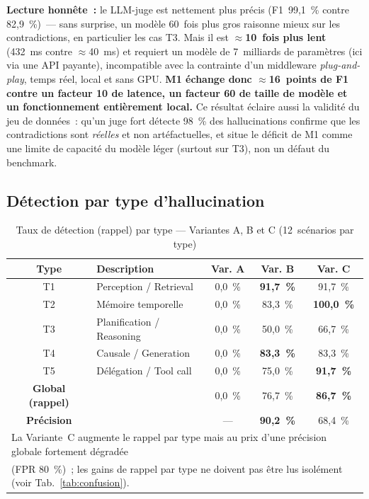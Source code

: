 \documentclass[12pt,a4paper]{article}
\begin{document}
\textbf{Lecture honnête~:} le LLM-juge est nettement plus précis (F1~99,1~\% contre 82,9~\%)~--- sans surprise, un modèle 60~fois plus gros raisonne mieux sur les contradictions, en particulier les cas T3. Mais il est $\approx$\textbf{10~fois plus lent} (432~ms contre $\approx$40~ms) et requiert un modèle de 7~milliards de paramètres (ici via une API payante), incompatible avec la contrainte d'un middleware \emph{plug-and-play}, temps réel, local et sans GPU. \textbf{M1 échange donc $\approx$16~points de F1 contre un facteur 10 de latence, un facteur 60 de taille de modèle et un fonctionnement entièrement local.} Ce résultat éclaire aussi la validité du jeu de données~: qu'un juge fort détecte 98~\% des hallucinations confirme que les contradictions sont \emph{réelles} et non artéfactuelles, et situe le déficit de M1 comme une limite de capacité du modèle léger (surtout sur T3), non un défaut du benchmark.

\subsection{Détection par type d'hallucination}

\begin{table}[H]
\centering
\caption{Taux de détection (rappel) par type --- Variantes A, B et C (12~scénarios par type)}
\label{tab:results_by_type}
\renewcommand{\arraystretch}{1.25}
\begin{tabular}{clccc}
\toprule
\textbf{Type} & \textbf{Description} & \textbf{Var. A} & \textbf{Var. B} & \textbf{Var. C} \\
\midrule
T1 & Perception / Retrieval    & 0,0~\% & \textbf{91,7~\%} & 91,7~\% \\
T2 & Mémoire temporelle        & 0,0~\% & 83,3~\%          & \textbf{100,0~\%} \\
T3 & Planification / Reasoning & 0,0~\% & 50,0~\%          & 66,7~\% \\
T4 & Causale / Generation      & 0,0~\% & \textbf{83,3~\%} & 83,3~\% \\
T5 & Délégation / Tool call    & 0,0~\% & 75,0~\%          & \textbf{91,7~\%} \\
\midrule
\textbf{Global (rappel)} & & 0,0~\% & 76,7~\% & \textbf{86,7~\%} \\
\textbf{Précision} & & --- & \textbf{90,2~\%} & 68,4~\% \\
\bottomrule
\multicolumn{5}{l}{\small La Variante~C augmente le rappel par type mais au prix d'une précision globale fortement dégradée}\\
\multicolumn{5}{l}{\small (FPR 80~\%)~; les gains de rappel par type ne doivent pas être lus isolément (voir Tab.~\ref{tab:confusion}).}
\end{tabular}
\end{table}
\end{document}
